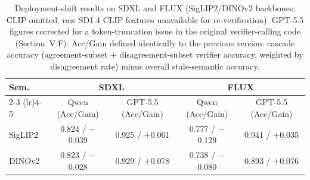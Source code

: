 
\begin{table}[h]
\centering
\footnotesize
\setlength{\tabcolsep}{3pt}
\caption{Deployment-shift results on SDXL and FLUX (SigLIP2/DINOv2 backbones; CLIP omitted, raw SD1.4 CLIP features unavailable for re-verification). GPT-5.5 figures corrected for a token-truncation issue in the original verifier-calling code (Section~V.F). Acc/Gain defined identically to the previous version: cascade accuracy (agreement-subset + disagreement-subset verifier accuracy, weighted by disagreement rate) minus overall stale-semantic accuracy.}
\label{tab:e8_results}
\begin{tabular}{lcccc}
\toprule
Sem. & \multicolumn{2}{c}{SDXL} & \multicolumn{2}{c}{FLUX} \\
\cmidrule(lr){2-3} \cmidrule(lr){4-5}
 & Qwen (Acc/Gain) & GPT-5.5 (Acc/Gain) & Qwen (Acc/Gain) & GPT-5.5 (Acc/Gain) \\
\midrule
SigLIP2 & 0.824 / $-$0.039 & 0.925 / $+$0.061 & 0.777 / $-$0.129 & 0.941 / $+$0.035 \\
DINOv2  & 0.823 / $-$0.028 & 0.929 / $+$0.078 & 0.738 / $-$0.080 & 0.893 / $+$0.076 \\
\bottomrule
\end{tabular}
\end{table}

